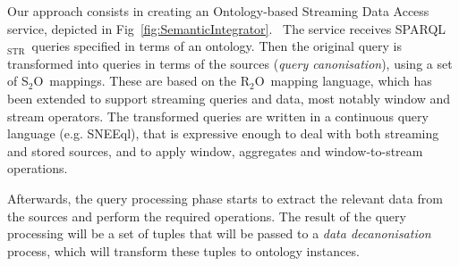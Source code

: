 \documentclass[runningheads,a4paper]{llncs}
\newcommand{\subscript}[1]{\ensuremath{_{\textrm{#1}}}}
\newcommand{\rtwoo}{\textsf{R\subscript{2}O}}
\newcommand{\stwoo}{\textsf{S\subscript{2}O}}
\newcommand{\sparqlstr}{SPARQL\subscript{STR}}
\begin{document}
Our approach consists in creating an Ontology-based Streaming Data Access service, depicted in Fig~\ref{fig:SemanticIntegrator}.\ %
The service receives \sparqlstr\ queries specified in terms of 
an ontology.
Then the original query is transformed into queries in terms of the sources (\textit{query canonisation}), using 
a set of \stwoo\ mappings. These are based on the \rtwoo\ mapping language, which has been extended to support  streaming queries and data, most notably window and stream operators. 
The transformed queries are written in a continuous query language (e.g. SNEEql), that is expressive enough to deal with both streaming and stored sources, and to apply window, aggregates and window-to-stream operations.

Afterwards, the query processing phase starts %
to extract the relevant data from the sources and perform the required operations.
%
The result of the query processing will be a set of tuples that will be passed to a \textit{data decanonisation} process, which will transform these tuples to ontology instances.

\end{document}
